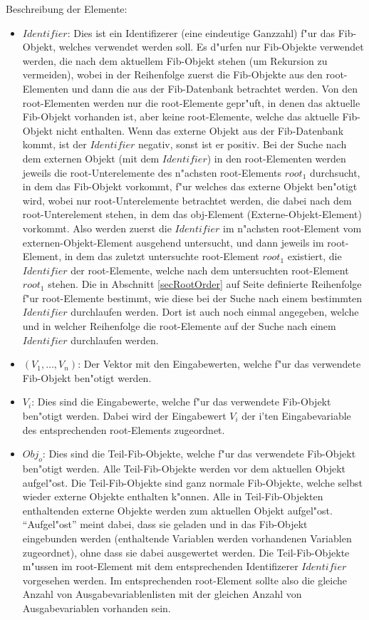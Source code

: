 \bigskip\noindent
Beschreibung der Elemente:
\begin{itemize}
 \item $Identifier$: Dies ist ein Identifizerer (eine eindeutige Ganzzahl) f"ur das Fib-Objekt, welches verwendet werden soll. Es d"urfen nur Fib-Objekte verwendet werden, die nach dem aktuellem Fib-Objekt stehen (um Rekursion zu vermeiden), wobei in der Reihenfolge zuerst die Fib-Objekte aus den root-Elementen und dann die aus der Fib-Datenbank betrachtet werden. Von den root-Elementen werden nur die root-Elemente gepr"uft, in denen das aktuelle Fib-Objekt vorhanden ist, aber keine root-Elemente, welche das aktuelle Fib-Objekt nicht enthalten. Wenn das externe Objekt aus der Fib-Datenbank kommt, ist der $Identifier$ negativ, sonst ist er positiv. Bei der Suche nach dem externen Objekt (mit dem $Identifier$) in den root-Elementen werden jeweils die root-Unterelemente des n"achsten root-Elements $root_1$ durchsucht, in dem das Fib-Objekt vorkommt, f"ur welches das externe Objekt ben"otigt wird, wobei nur root-Unter\-ele\-mente betrachtet werden, die dabei nach dem root-Unterelement stehen, in dem das obj-Element (Externe-Objekt-Element) vorkommt. Also werden zuerst die $Identifier$ im n"achsten root-Element vom externen-Objekt-Element ausgehend untersucht, und dann jeweils im root-Element, in dem das zuletzt untersuchte root-Element $root_1$ existiert, die $Identifier$ der root-Elemente, welche nach dem untersuchten root-Element $root_1$ stehen. Die in Abschnitt \ref{secRootOrder} auf Seite \pageref{secRootOrder} definierte Reihenfolge f"ur root-Elemente bestimmt, wie diese bei der Suche nach einem bestimmten $Identifier$ durchlaufen werden. Dort ist auch noch einmal angegeben, welche und in welcher Reihenfolge die root-Elemente auf der Suche nach einem $Identifier$ durchlaufen werden.
 \item $( V_1 , \ldots , V_n )$: Der Vektor mit den Eingabewerten, welche f"ur das verwendete Fib-Objekt ben"otigt werden.
 \item $V_i$: Dies sind die Eingabewerte, welche f"ur das verwendete Fib-Objekt ben"otigt werden. Dabei wird der Eingabewert $V_i$ der i'ten Eingabevariable des entsprechenden root-Elements zugeordnet.
 \item $Obj_o$: Dies sind die Teil-Fib-Objekte, welche f"ur das verwendete Fib-Objekt ben"otigt werden. Alle Teil-Fib-Objekte werden vor dem aktuellen Objekt aufgel"ost. Die Teil-Fib-Objekte sind ganz normale Fib-Objekte, welche selbst wieder externe Objekte enthalten k"onnen. Alle in Teil-Fib-Objekten enthaltenden externe Objekte werden zum aktuellen Objekt aufgel"ost. ``Aufgel"ost'' meint dabei, dass sie geladen und in das Fib-Objekt eingebunden werden (enthaltende Variablen werden vorhandenen Variablen zugeordnet), ohne dass sie dabei ausgewertet werden. Die Teil-Fib-Objekte m"ussen im root-Element mit dem entsprechenden Identifizerer $Identifier$ vorgesehen werden. Im entsprechenden root-Element sollte also die gleiche Anzahl von Ausgabevariablenlisten mit der gleichen Anzahl von Ausgabevariablen vorhanden sein.

\end{itemize}
